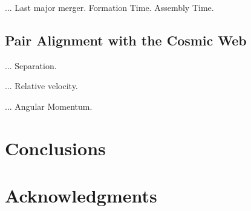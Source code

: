 \documentclass[usenatbib]{latex/mn2e}
\begin{document}
... Last major merger. Formation Time. Assembly Time.

\subsection{Pair Alignment with the Cosmic Web}
\label{subsec:alignment_cosmic_web}

... Separation.

... Relative velocity.

... Angular Momentum.


\section{Conclusions}
\label{sec:conclusions}


\section*{Acknowledgments}  



 




\end{document}
